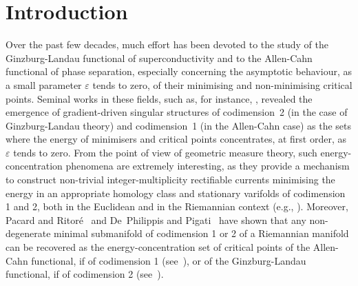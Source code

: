 \documentclass[a4paper, 11pt, twoside, leqno]{article}
\theoremstyle{definition}              %
\theoremstyle{remark}                  %
\newcommand{\eps}{\varepsilon}
\begin{document}
\section*{Introduction}
Over the past few decades, much effort has been devoted to the study of  
the Ginzburg-Landau functional of superconductivity 
and to the Allen-Cahn functional of phase separation, 
especially concerning the asymptotic behaviour, as a small 
parameter $\eps$ tends to zero, of their 
minimising and non-minimising critical points.  
Seminal works in these fields, such as, for instance, 
\cite{BBH, BBO, AlbertiBaldoOrlandi, JerrardSoner, SandierSerfaty, Modica, Sternberg, Ilmanen, HutchinsonTonegawa, B}, 
revealed the emergence of gradient-driven singular structures of codimension~2 
(in the case of Ginzburg-Landau theory) and codimension~1 (in the 
Allen-Cahn case) as the sets where the energy of minimisers and 
critical points concentrates, at first order, as $\eps$ tends to zero.
From the point of view of geometric measure theory, such 
energy-concentration phenomena are extremely interesting, as they provide 
a mechanism to construct non-trivial integer-multiplicity rectifiable 
currents minimising the energy in an appropriate homology class and 
stationary varifolds of codimension 1 and 2, both in the 
Euclidean and in the Riemannian context
(e.g., \cite{Baraket, Orlandi, IgnatJerrard, CDO1, CDO2, PigatiStern, ParisePigatiStern, DePhilippisPigati,  PisantePunzo1, LiPariseSarnataro}). 
Moreover, Pacard and Ritor\'e~\cite{PacardRitore} and De~Philippis and Pigati~\cite{DePhilippisPigati} have shown that 
any non-degenerate minimal submanifold of codimension 1 or 2 of a Riemannian 
manifold can be recovered as the energy-concentration set of critical 
points of the Allen-Cahn functional, if of codimension 1 (see~\cite{PacardRitore}), or of 
the Ginzburg-Landau functional, if of codimension 2 (see~\cite{DePhilippisPigati}). 
\end{document}
